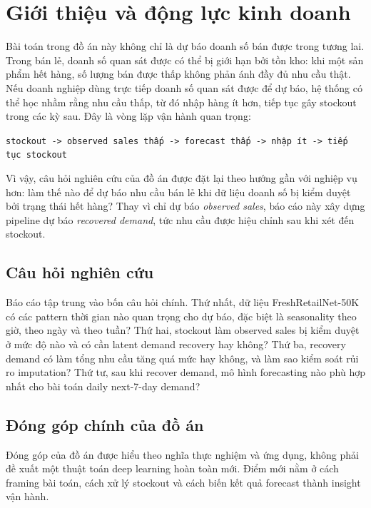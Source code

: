 \section{Giới thiệu và động lực kinh doanh}

Bài toán trong đồ án này không chỉ là dự báo doanh số bán được trong tương lai. Trong bán lẻ, doanh số quan sát được có thể bị giới hạn bởi tồn kho: khi một sản phẩm hết hàng, số lượng bán được thấp không phản ánh đầy đủ nhu cầu thật. Nếu doanh nghiệp dùng trực tiếp doanh số quan sát được để dự báo, hệ thống có thể học nhầm rằng nhu cầu thấp, từ đó nhập hàng ít hơn, tiếp tục gây stockout trong các kỳ sau. Đây là vòng lặp vận hành quan trọng:

\begin{center}
\texttt{stockout -> observed sales thấp -> forecast thấp -> nhập ít -> tiếp tục stockout}
\end{center}

Vì vậy, câu hỏi nghiên cứu của đồ án được đặt lại theo hướng gần với nghiệp vụ hơn: làm thế nào để dự báo nhu cầu bán lẻ khi dữ liệu doanh số bị kiểm duyệt bởi trạng thái hết hàng? Thay vì chỉ dự báo \textit{observed sales}, báo cáo này xây dựng pipeline dự báo \textit{recovered demand}, tức nhu cầu được hiệu chỉnh sau khi xét đến stockout.

\subsection{Câu hỏi nghiên cứu}

Báo cáo tập trung vào bốn câu hỏi chính. Thứ nhất, dữ liệu FreshRetailNet-50K có các pattern thời gian nào quan trọng cho dự báo, đặc biệt là seasonality theo giờ, theo ngày và theo tuần? Thứ hai, stockout làm observed sales bị kiểm duyệt ở mức độ nào và có cần latent demand recovery hay không? Thứ ba, recovery demand có làm tổng nhu cầu tăng quá mức hay không, và làm sao kiểm soát rủi ro imputation? Thứ tư, sau khi recover demand, mô hình forecasting nào phù hợp nhất cho bài toán daily next-7-day demand?

\subsection{Đóng góp chính của đồ án}

Đóng góp của đồ án được hiểu theo nghĩa thực nghiệm và ứng dụng, không phải đề xuất một thuật toán deep learning hoàn toàn mới. Điểm mới nằm ở cách framing bài toán, cách xử lý stockout và cách biến kết quả forecast thành insight vận hành.

